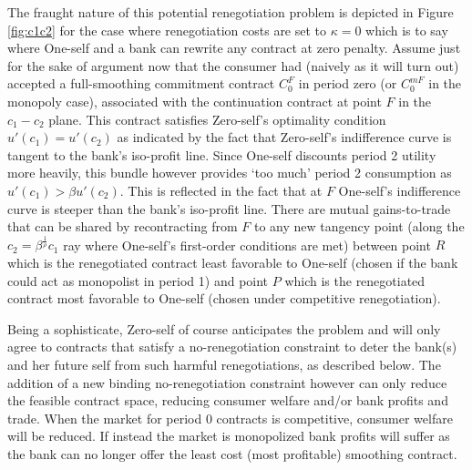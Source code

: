 \documentclass[11pt,english]{article}
\theoremstyle{plain}
\theoremstyle{definition}
\begin{document}
The fraught nature of this potential renegotiation problem is depicted
in Figure \ref{fig:c1c2} for the case where renegotiation costs are
set to $\kappa=0$ which is to say where One-self and a bank can rewrite
any contract at zero penalty. Assume \textendash{} just for the sake
of argument now \textendash{} that the consumer had (naively as it
will turn out) accepted a full-smoothing commitment contract $C_{0}^{F}$
in period zero (or $C_{0}^{mF}$ in the monopoly case), associated
with the continuation contract at point $F$ in the $c_{1}-c_{2}$
plane. This contract satisfies Zero-self's optimality condition $u'(c_{1})=u'(c_{2})$
as indicated by the fact that Zero-self's indifference curve is tangent
to the bank's iso-profit line. Since One-self discounts period 2 utility
more heavily, this bundle however provides `too much' period 2 consumption
as $u'(c_{1})>\beta u'(c_{2}).$ This is reflected in the fact that
at $F$ One-self's indifference curve is steeper than the bank's iso-profit
line. There are mutual gains-to-trade that can be shared by recontracting
from $F$ to any new tangency point (along the $c_{2}=\beta^{\frac{1}{\rho}}c_{1}$
ray where One-self's first-order conditions are met) between point
$R$ which is the renegotiated contract least favorable to One-self
(chosen if the bank could act as monopolist in period 1) and point
$P$ which is the renegotiated contract most favorable to One-self
(chosen under competitive renegotiation).

Being a sophisticate, Zero-self of course anticipates the problem
and will only agree to contracts that satisfy a no-renegotiation constraint
to deter the bank(s) and her future self from such harmful renegotiations,
as described below. The addition of a new binding no-renegotiation
constraint however can only reduce the feasible contract space, reducing
consumer welfare and/or bank profits and trade. When the market for
period 0 contracts is competitive, consumer welfare will be reduced.
If instead the market is monopolized bank profits will suffer as the
bank can no longer offer the least cost (most profitable) smoothing
contract.
\end{document}
